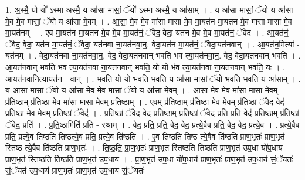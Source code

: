 \documentclass[17pt]{extarticle}
\begin{document}
1. अ॒स्मै॒ यो यो᳚ ऽस्मा अस्मै॒ य आ॑सा मासां॒ ॅयो᳚ ऽस्मा अस्मै॒ य आ॑साम् । . य आ॑सा मासां॒ ॅयो य आ॑सा मे॒व मे॒व मा॑सां॒ ॅयो य आ॑सा मे॒वम् । . आ॒सा॒ मे॒व मे॒व मा॑सा मासा मे॒व मा॒यत॑न मा॒यत॑न मे॒व मा॑सा मासा मे॒व मा॒यत॑नम् । . ए॒व मा॒यत॑न मा॒यत॑न मे॒व मे॒व मा॒यत॑नं॒ ॅवेद॒ वेदा॒ यत॑न मे॒व मे॒व मा॒यत॑नं॒ ॅवेद॑ । . आ॒यत॑नं॒ ॅवेद॒ वेदा॒ यत॑न मा॒यत॑नं॒ ॅवेदा॒ यत॑नवा ना॒यत॑नवा॒न्॒. वेदा॒यत॑न मा॒यत॑नं॒ ॅवेदा॒यत॑नवान् । . आ॒यत॑न॒मित्या᳚ - यत॑नम् । . वेदा॒यत॑नवा ना॒यत॑नवा॒न्॒. वेद॒ वेदा॒यत॑नवान् भवति भव त्या॒यत॑नवा॒न्॒. वेद॒ वेदा॒यत॑नवान् भवति । . आ॒यत॑नवान् भवति भव त्या॒यत॑नवा ना॒यत॑नवान् भवति॒ यो यो भ॑व त्या॒यत॑नवा ना॒यत॑नवान् भवति॒ यः । . आ॒यत॑नवा॒नित्या॒यत॑न - वा॒न् । . भ॒व॒ति॒ यो यो भ॑वति भवति॒ य आ॑सा मासां॒ ॅयो भ॑वति भवति॒ य आ॑साम् । . य आ॑सा मासां॒ ॅयो य आ॑सा मे॒व मे॒व मा॑सां॒ ॅयो य आ॑सा मे॒वम् । . आ॒सा॒ मे॒व मे॒व मा॑सा मासा मे॒वम् प्र॑ति॒ष्ठाम् प्र॑ति॒ष्ठा मे॒व मा॑सा मासा मे॒वम् प्र॑ति॒ष्ठाम् । . ए॒वम् प्र॑ति॒ष्ठाम् प्र॑ति॒ष्ठा मे॒व मे॒वम् प्र॑ति॒ष्ठां ॅवेद॒ वेद॑ प्रति॒ष्ठा मे॒व मे॒वम् प्र॑ति॒ष्ठां ॅवेद॑ । . प्र॒ति॒ष्ठां ॅवेद॒ वेद॑ प्रति॒ष्ठाम् प्र॑ति॒ष्ठां ॅवेद॒ प्रति॒ प्रति॒ वेद॑ प्रति॒ष्ठाम् प्र॑ति॒ष्ठां ॅवेद॒ प्रति॑ । . प्र॒ति॒ष्ठामिति॑ प्रति - स्थाम् । . वेद॒ प्रति॒ प्रति॒ वेद॒ वेद॒ प्रत्ये॒वैव प्रति॒ वेद॒ वेद॒ प्रत्ये॒व । . प्रत्ये॒वैव प्रति॒ प्रत्ये॒व ति॑ष्ठति तिष्ठत्ये॒व प्रति॒ प्रत्ये॒व ति॑ष्ठति । . ए॒व ति॑ष्ठति तिष्ठ त्ये॒वैव ति॑ष्ठति प्राण॒भृतः॑ प्राण॒भृत॑ स्तिष्ठ त्ये॒वैव ति॑ष्ठति प्राण॒भृतः॑ । . ति॒ष्ठ॒ति॒ प्रा॒ण॒भृतः॑ प्राण॒भृत॑ स्तिष्ठति तिष्ठति प्राण॒भृत॑ उप॒धा यो॑प॒धाय॑ प्राण॒भृत॑ स्तिष्ठति तिष्ठति प्राण॒भृत॑ उप॒धाय॑ । . प्रा॒ण॒भृत॑ उप॒धा यो॑प॒धाय॑ प्राण॒भृतः॑ प्राण॒भृत॑ उप॒धाय॑ सं॒ॅयतः॑ सं॒ॅयत॑ उप॒धाय॑ प्राण॒भृतः॑ प्राण॒भृत॑ उप॒धाय॑ सं॒ॅयतः॑ । \newline
\end{document}
